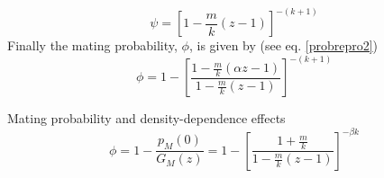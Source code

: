 \documentclass[12pt,a4paper]{article}
\theoremstyle{plain}%
\theoremstyle{definition}
\theoremstyle{remark}
\begin{document}
\begin{equation}\label{phibn}
\psi=	 \left[ 1-\frac{m}{k}(z-1)\right] ^{-(k+1)} 
\end{equation}     
Finally the mating probability, $\phi$, is given by (see eq. \eqref{probrepro2})
\begin{equation} 
\phi=
1-\left[ \frac{ 1-\frac{m}{k}(\alpha z-1)}{1-\frac{m}{k}(z-1) }\right]  ^{-(k+1)} 
\end{equation}

Mating probability and density-dependence effects
\begin{equation}
\phi= 1-\frac{p_M(0)}{G_M(z)}=1-\left[ \frac{1+\frac{m}{k}}{1-\frac{m}{k}(z-1)}\right]^{-\beta k} 
\end{equation}
\end{document}
